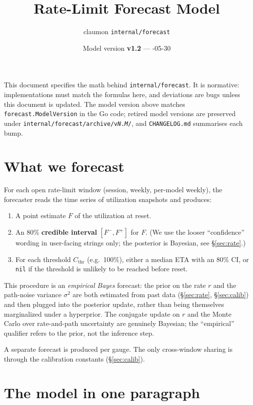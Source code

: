 \documentclass[11pt]{article}
\title{Rate-Limit Forecast Model}
\author{claumon \texttt{internal/forecast}}
\date{Model version \textbf{v1.2} \enspace --- \enspace 2026-05-30}
\newcommand{\Cthr}{C_{\text{thr}}}
\begin{document}
\maketitle

This document specifies the math behind \texttt{internal/forecast}. It is
normative: implementations must match the formulas here, and deviations are
bugs unless this document is updated. The model version above matches
\texttt{forecast.ModelVersion} in the Go code; retired model versions are
preserved under \texttt{internal/forecast/archive/v\textit{N}.\textit{M}/},
and \texttt{CHANGELOG.md} summarises each bump.

\section{What we forecast}

For each open rate-limit window (session, weekly, per-model weekly), the
forecaster reads the time series of utilization snapshots and produces:

\begin{enumerate}
  \item A point estimate $F$ of the utilization at reset.
  \item An 80\% \textbf{credible interval} $[F^-, F^+]$ for $F$. (We use the
    looser ``confidence'' wording in user-facing strings only; the posterior
    is Bayesian, see \S\ref{sec:rate}.)
  \item For each threshold $\Cthr$ (e.g.\ 100\%), either a median ETA with an
    80\% CI, or \texttt{nil} if the threshold is unlikely to be reached
    before reset.
\end{enumerate}

This procedure is an \emph{empirical Bayes} forecast: the prior on the rate
$r$ and the path-noise variance $\sigma^2$ are both estimated from past data
(\S\ref{sec:rate}, \S\ref{sec:calib}) and then plugged into the posterior
update, rather than being themselves marginalized under a hyperprior. The
conjugate update on $r$ and the Monte Carlo over rate-and-path uncertainty
are genuinely Bayesian; the ``empirical'' qualifier refers to the prior, not
the inference step.

A separate forecast is produced per gauge. The only cross-window sharing is
through the calibration constants (\S\ref{sec:calib}).

\section{The model in one paragraph}
\end{document}
